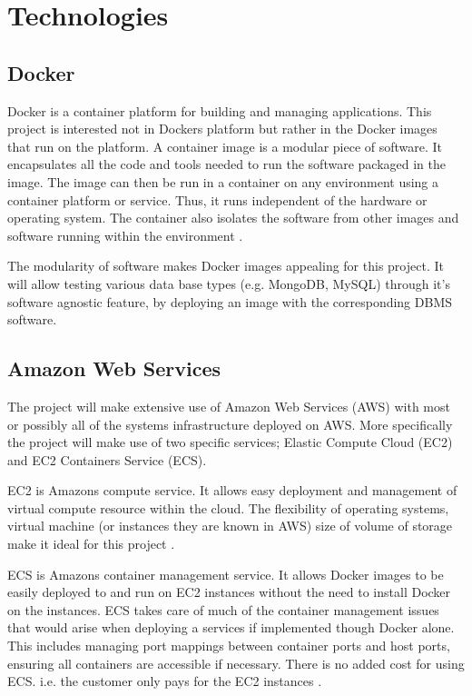 \section{Technologies}

\subsection{Docker}
Docker is a container platform for building and managing applications. This project is interested not in Dockers platform but rather in the Docker images that run on the platform. A container image is a modular piece of software. It encapsulates all the code and tools needed to run the software packaged in the image. The image can then be run in a container on any environment using a container platform or service. Thus, it runs independent of the hardware or operating system. The container also isolates the software from other images and software running within the environment \citep{docker}.

The modularity of software makes Docker images appealing for this project. It will allow testing various data base types (e.g. MongoDB, MySQL) through it's software agnostic feature, by deploying an image with the corresponding DBMS software.

\subsection{Amazon Web Services}
The project will make extensive use of Amazon Web Services (AWS) with most or possibly all of the systems infrastructure deployed on AWS. More specifically the project will make use of two specific services; Elastic Compute Cloud (EC2) and EC2 Containers Service (ECS).

EC2 is Amazons compute service. It allows easy deployment and management of virtual compute resource within the cloud. The flexibility of operating systems, virtual machine (or instances  they are known in AWS)  size of volume of storage make it ideal for this project \citep{ec2}.

ECS is Amazons container management service. It allows Docker images to be easily deployed to and run on  EC2 instances without the need to install Docker on the instances. ECS takes care of much of the container management issues that would arise when deploying a services if implemented though Docker alone. This includes managing port mappings between container ports and host ports, ensuring all containers are accessible if necessary. There is no added cost for using ECS. i.e. the customer only pays for the EC2 instances \citep{ecs}. 

